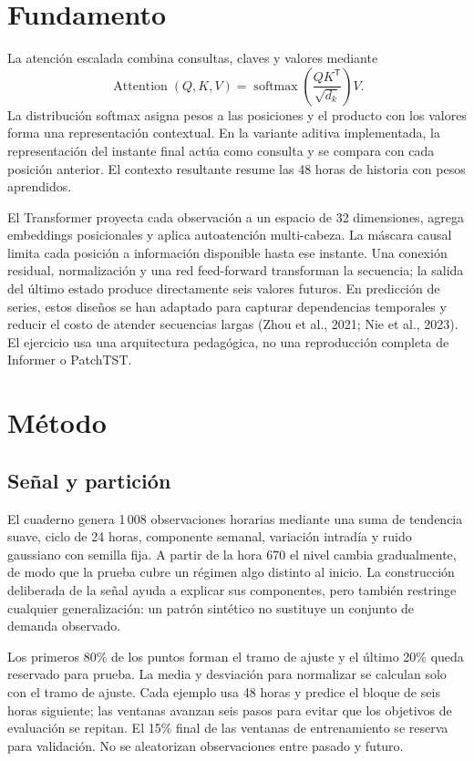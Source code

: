 \documentclass[12pt]{article}
\begin{document}
\section{Fundamento}
La atención escalada combina consultas, claves y valores mediante
\begin{equation}
\operatorname{Attention}(Q,K,V)=\operatorname{softmax}\!\left(\frac{QK^{\mathsf T}}{\sqrt{d_k}}\right)V.
\end{equation}
La distribución softmax asigna pesos a las posiciones y el producto con los valores forma una representación contextual. En la variante aditiva implementada, la representación del instante final actúa como consulta y se compara con cada posición anterior. El contexto resultante resume las 48 horas de historia con pesos aprendidos.

El Transformer proyecta cada observación a un espacio de 32 dimensiones, agrega embeddings posicionales y aplica autoatención multi-cabeza. La máscara causal limita cada posición a información disponible hasta ese instante. Una conexión residual, normalización y una red feed-forward transforman la secuencia; la salida del último estado produce directamente seis valores futuros. En predicción de series, estos diseños se han adaptado para capturar dependencias temporales y reducir el costo de atender secuencias largas (Zhou et al., 2021; Nie et al., 2023). El ejercicio usa una arquitectura pedagógica, no una reproducción completa de Informer o PatchTST.

\section{Método}
\subsection{Señal y partición}
El cuaderno genera 1\,008 observaciones horarias mediante una suma de tendencia suave, ciclo de 24 horas, componente semanal, variación intradía y ruido gaussiano con semilla fija. A partir de la hora 670 el nivel cambia gradualmente, de modo que la prueba cubre un régimen algo distinto al inicio. La construcción deliberada de la señal ayuda a explicar sus componentes, pero también restringe cualquier generalización: un patrón sintético no sustituye un conjunto de demanda observado.

Los primeros 80\% de los puntos forman el tramo de ajuste y el último 20\% queda reservado para prueba. La media y desviación para normalizar se calculan solo con el tramo de ajuste. Cada ejemplo usa 48 horas y predice el bloque de seis horas siguiente; las ventanas avanzan seis pasos para evitar que los objetivos de evaluación se repitan. El 15\% final de las ventanas de entrenamiento se reserva para validación. No se aleatorizan observaciones entre pasado y futuro.
\end{document}
